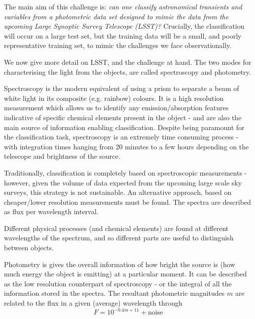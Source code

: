 \documentclass[\docopts]{\docclass}
\begin{document}
The main aim of this challenge is: \textit{can one classify astronomical transients and variables from a photometric data set designed to mimic the data from the upcoming Large Synoptic Survey Telescope (LSST)?} Crucially, the classification will occur on a large test set, but the training data will be a small, and poorly representative training set, to mimic the challenges we face observationally.

We now give more detail on LSST, and the challenge at hand. The two modes for characterising the light from the objects, are called spectroscopy and photometry.

Spectroscopy is the modern equivalent of using a prism to separate a beam of white light in its composite (e.g. rainbow) colours. It is a high resolution measurement which allows us to identify any emission/absorption features indicative of specific chemical elements present in the object - and are also the main source of information enabling classification. Despite being paramount for the classification task, spectroscopy is an extremely time consuming process - with integration times hanging from 20 minutes to a few hours depending on the telescope and brightness of the source.

Traditionally, classification is completely based on spectroscopic measurements - however, given the volume of data expected from the upcoming large scale sky surveys, this strategy is not sustainable. An alternative approach, based on cheaper/lower resolution measurements must be found. The spectra are described as flux per wavelength interval. 

Different physical processes (and chemical elements) are found at different wavelengths of the spectrum, and so different parts are useful to distinguish between objects.

Photometry is gives the overall information of how bright the source is (how much energy the object is emitting) at a particular moment. It can be described as the low resolution counterpart of spectroscopy - or the integral of all the information stored in the spectra. The resultant photometric magnitudes $m$ are related to the flux in a given (average) wavelength through 
\begin{equation}
F = 10^{-0.4m+11} + \mbox{noise}
\end{equation}
\end{document}
